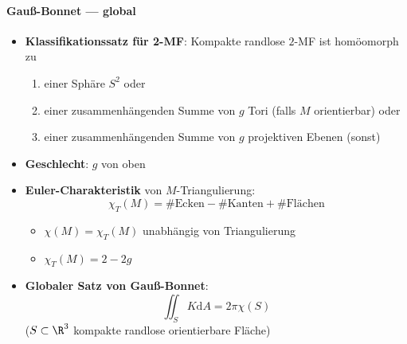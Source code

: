 \paragraph{Gauß-Bonnet --- global}
\begin{itemize}
  \item \textbf{Klassifikationssatz für 2-MF}: Kompakte randlose \( 2 \)-MF ist homöomorph zu
  \begin{enumerate}
    \item einer Sphäre \( S^2 \) oder
    \item einer zusammenhängenden Summe von \( g \) Tori (falls \( M \) orientierbar) oder 
    \item einer zusammenhängenden Summe von \( g \) projektiven Ebenen (sonst)
  \end{enumerate}
  \item \textbf{Geschlecht}: \( g \) von oben
  \item \textbf{Euler-Charakteristik} von \( M \)-Triangulierung:
  \begin{equation*}
    \chi_T(M) = \#\text{Ecken} - \#\text{Kanten} + \#\text{Flächen}
  \end{equation*}
  \begin{itemize}
    \item \( \chi(M) = \chi_T(M) \) unabhängig von Triangulierung
    \item \( \chi_T(M) = 2-2g \)
  \end{itemize}
  \item \textbf{Globaler Satz von Gauß-Bonnet}:
  \begin{equation*}
    \iint_S K\text{d}A = 2\pi \chi(S)
  \end{equation*}
  (\( S \subset \R^3 \) kompakte randlose orientierbare Fläche)
\end{itemize}